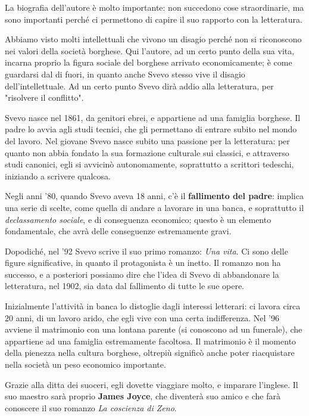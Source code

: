 La biografia dell'autore è molto importante: non succedono cose straordinarie, ma sono importanti perché ci permettono di capire il suo rapporto con la letteratura.

Abbiamo visto molti intellettuali che vivono un disagio perché non si riconoscono nei valori della società borghese. Qui l'autore, ad un certo punto della sua vita, incarna proprio la figura sociale del borghese arrivato economicamente; è come guardarsi dal di fuori, in quanto anche Svevo stesso vive il disagio dell'intellettuale.
Ad un certo punto Svevo dirà addio alla letteratura, per "risolvere il conflitto".

Svevo nasce nel 1861, da genitori ebrei, e appartiene ad una famiglia borghese. Il padre lo avvia agli studi tecnici, che gli permettano di entrare subito nel mondo del lavoro.
Nel giovane Svevo nasce subito una passione per la letteratura: per quanto non abbia fondato la sua formazione culturale sui classici, e attraverso studi canonici, egli si avvicinò autonomamente, soprattutto a scrittori tedeschi, iniziando a scrivere qualcosa.

Negli anni '80, quando Svevo aveva 18 anni, c'è il \textbf{fallimento del padre}: implica una serie di scelte, come quella di andare a lavorare in una banca, e soprattutto il \textit{declassamento sociale}, e di conseguenza economico; questo è un elemento fondamentale, che avrà delle conseguenze estremamente gravi.

Dopodiché, nel '92 Svevo scrive il suo primo romanzo: \textit{Una vita}.
Ci sono delle figure significative, in quanto il protagonista è un inetto.
Il romanzo non ha successo, e a posteriori possiamo dire che l'idea di Svevo di abbandonare la letteratura, nel 1902, sia data dal fallimento di tutte le sue opere.

Inizialmente l'attività in banca lo distoglie dagli interessi letterari: ci lavora circa 20 anni, di un lavoro arido, che egli vive con una certa indifferenza.
Nel '96 avviene il matrimonio con una lontana parente (si conoscono ad un funerale), che appartiene ad una famiglia estremamente facoltosa.
Il matrimonio è il momento della pienezza nella cultura borghese, oltrepiù significò anche poter riacquistare nella società un peso economico importante.

Grazie alla ditta dei suoceri, egli dovette viaggiare molto, e imparare l'inglese. Il suo maestro sarà proprio \textbf{James Joyce}, che diventerà suo amico e che farà conoscere il suo romanzo \textit{La coscienza di Zeno}.

